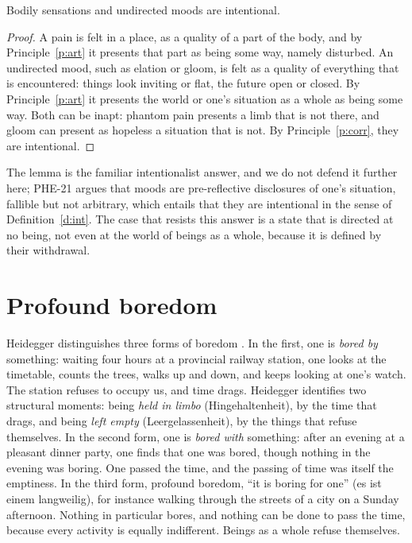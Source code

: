 \documentclass{situationist-preprint}
\begin{document}
\begin{lemma}\label{l:sens}
Bodily sensations and undirected moods are intentional.
\end{lemma}

\begin{proof}
A pain is felt in a place, as a quality of a part of the body, and by Principle~\ref{p:art} it presents that part as being some way, namely disturbed. An undirected mood, such as elation or gloom, is felt as a quality of everything that is encountered: things look inviting or flat, the future open or closed. By Principle~\ref{p:art} it presents the world or one's situation as a whole as being some way. Both can be inapt: phantom pain presents a limb that is not there, and gloom can present as hopeless a situation that is not. By Principle~\ref{p:corr}, they are intentional.
\end{proof}

The lemma is the familiar intentionalist answer, and we do not defend it further here; PHE-21 argues that moods are pre-reflective disclosures of one's situation, fallible but not arbitrary, which entails that they are intentional in the sense of Definition~\ref{d:int}. The case that resists this answer is a state that is directed at no being, not even at the world of beings as a whole, because it is defined by their withdrawal.

\section{Profound boredom}

Heidegger distinguishes three forms of boredom \citep[\S\S 18--38]{Heidegger1995}. In the first, one is \emph{bored by} something: waiting four hours at a provincial railway station, one looks at the timetable, counts the trees, walks up and down, and keeps looking at one's watch. The station refuses to occupy us, and time drags. Heidegger identifies two structural moments: being \emph{held in limbo} (Hingehaltenheit), by the time that drags, and being \emph{left empty} (Leergelassenheit), by the things that refuse themselves. In the second form, one is \emph{bored with} something: after an evening at a pleasant dinner party, one finds that one was bored, though nothing in the evening was boring. One passed the time, and the passing of time was itself the emptiness. In the third form, profound boredom, \enquote{it is boring for one} (es ist einem langweilig), for instance walking through the streets of a city on a Sunday afternoon. Nothing in particular bores, and nothing can be done to pass the time, because every activity is equally indifferent. Beings as a whole refuse themselves.
\end{document}
